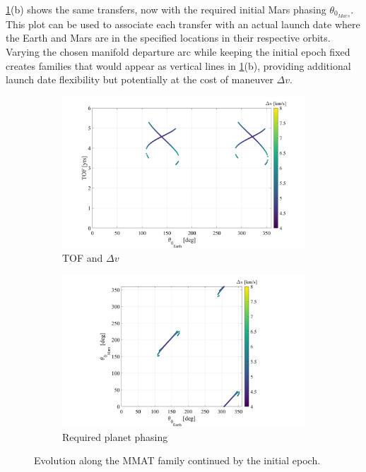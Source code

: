 \cref{fig:MMATEvo}(b) shows the same transfers, now with the required initial Mars phasing
$\theta_{0_{Mars}}$. This plot can be used to associate each transfer with an actual launch date
where the Earth and Mars are in the specified locations in their respective orbits. Varying the
chosen manifold departure arc while keeping the initial epoch fixed creates families that would
appear as vertical lines in \cref{fig:MMATEvo}(b), providing additional launch date flexibility but
potentially at the cost of maneuver $\Delta v$.

\begin{figure}[ht]
    \begin{subfigure}[h]{0.495\linewidth}
        \includegraphics[width=\textwidth]{figures/MMATTOF.pdf}
        \caption{TOF and $\Delta v$}
    \end{subfigure}
    \hfill
    \begin{subfigure}[h]{0.495\linewidth}
        \includegraphics[width=\textwidth]{figures/MMATtheta.pdf}
        \caption{Required planet phasing}
    \end{subfigure}
    \caption{Evolution along the MMAT family continued by the initial epoch.}
    \label{fig:MMATEvo}
\end{figure}

